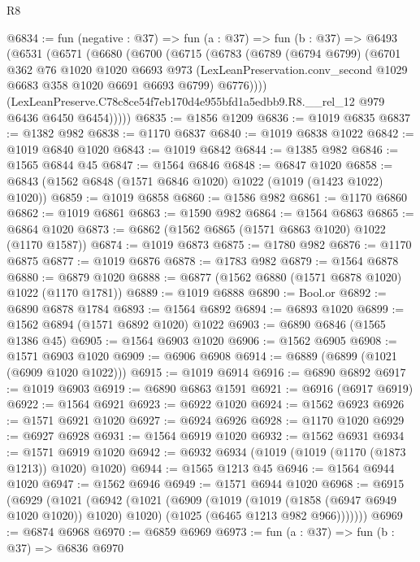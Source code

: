 \begin{lexlean}{R8}
\begin{coremodule}
@6834 := fun (negative : @37) =>
  fun (a : @37) =>
  fun (b : @37) =>
  @6493
    (@6531
      (@6571
        (@6680
          (@6700
            (@6715
              (@6783
                (@6789
                  (@6794 @6799)
                  (@6701
                    @362
                    @76
                    @1020
                    @1020
                    @6693
                    @973
                    (LexLeanPreservation.conv_second @1029 @6683 @358 @1020 @6691 @6693 @6799)
                    @6776))))
            (LexLeanPreserve.C78c8ce54f7eb170d4e955bfd1a5edbb9.R8.__rel_12
              @979
              @6436
              @6450
              @6454)))))
@6835 := @1856 @1209
@6836 := @1019 @6835
@6837 := @1382 @982
@6838 := @1170 @6837
@6840 := @1019 @6838 @1022
@6842 := @1019 @6840 @1020
@6843 := @1019 @6842
@6844 := @1385 @982
@6846 := @1565 @6844 @45
@6847 := @1564 @6846
@6848 := @6847 @1020
@6858 := @6843 (@1562 @6848 (@1571 @6846 @1020) @1022 (@1019 (@1423 @1022) @1020))
@6859 := @1019 @6858
@6860 := @1586 @982
@6861 := @1170 @6860
@6862 := @1019 @6861
@6863 := @1590 @982
@6864 := @1564 @6863
@6865 := @6864 @1020
@6873 := @6862 (@1562 @6865 (@1571 @6863 @1020) @1022 (@1170 @1587))
@6874 := @1019 @6873
@6875 := @1780 @982
@6876 := @1170 @6875
@6877 := @1019 @6876
@6878 := @1783 @982
@6879 := @1564 @6878
@6880 := @6879 @1020
@6888 := @6877 (@1562 @6880 (@1571 @6878 @1020) @1022 (@1170 @1781))
@6889 := @1019 @6888
@6890 := Bool.or
@6892 := @6890 @6878 @1784
@6893 := @1564 @6892
@6894 := @6893 @1020
@6899 := @1562 @6894 (@1571 @6892 @1020) @1022
@6903 := @6890 @6846 (@1565 @1386 @45)
@6905 := @1564 @6903 @1020
@6906 := @1562 @6905
@6908 := @1571 @6903 @1020
@6909 := @6906 @6908
@6914 := @6889 (@6899 (@1021 (@6909 @1020 @1022)))
@6915 := @1019 @6914
@6916 := @6890 @6892
@6917 := @1019 @6903
@6919 := @6890 @6863 @1591
@6921 := @6916 (@6917 @6919)
@6922 := @1564 @6921
@6923 := @6922 @1020
@6924 := @1562 @6923
@6926 := @1571 @6921 @1020
@6927 := @6924 @6926
@6928 := @1170 @1020
@6929 := @6927 @6928
@6931 := @1564 @6919 @1020
@6932 := @1562 @6931
@6934 := @1571 @6919 @1020
@6942 := @6932 @6934 (@1019 (@1019 (@1170 (@1873 @1213)) @1020) @1020)
@6944 := @1565 @1213 @45
@6946 := @1564 @6944 @1020
@6947 := @1562 @6946
@6949 := @1571 @6944 @1020
@6968 := @6915
    (@6929
      (@1021
        (@6942
          (@1021
            (@6909
              (@1019 (@1019 (@1858 (@6947 @6949 @1020 @1020)) @1020) @1020)
              (@1025 (@6465 @1213 @982 @966)))))))
@6969 := @6874 @6968
@6970 := @6859 @6969
@6973 := fun (a : @37) => fun (b : @37) => @6836 @6970

\end{coremodule}
\end{lexlean}
